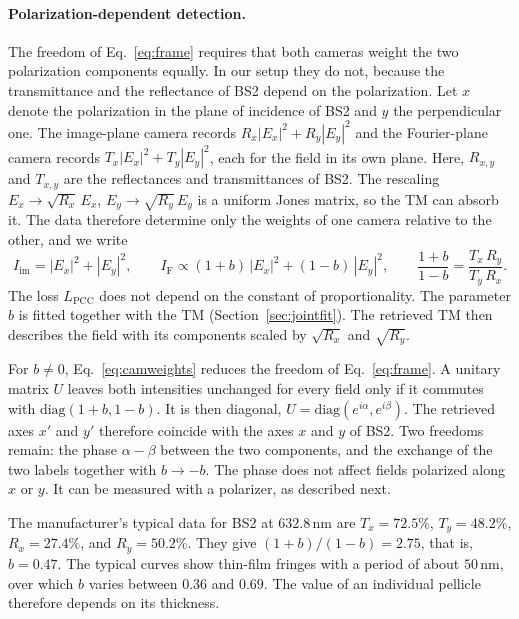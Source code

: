 \documentclass{article}
\begin{document}
\paragraph{Polarization-dependent detection.}
The freedom of Eq.~\eqref{eq:frame} requires that both cameras weight the two polarization components equally.
In our setup they do not, because the transmittance and the reflectance of BS2 depend on the polarization.
Let $x$ denote the polarization in the plane of incidence of BS2 and $y$ the perpendicular one.
The image-plane camera records $R_x|E_x|^2+R_y|E_y|^2$ and the Fourier-plane camera records $T_x|E_x|^2+T_y|E_y|^2$, each for the field in its own plane.
Here, $R_{x,y}$ and $T_{x,y}$ are the reflectances and transmittances of BS2.
The rescaling $E_x\to\sqrt{R_x}\,E_x$, $E_y\to\sqrt{R_y}\,E_y$ is a uniform Jones matrix, so the TM can absorb it.
The data therefore determine only the weights of one camera relative to the other, and we write
\begin{equation}
\label{eq:camweights}
I_{\mathrm{im}}=|E_x|^2+|E_y|^2,\qquad I_{\mathrm{F}}\propto(1+b)\,|E_x|^2+(1-b)\,|E_y|^2,\qquad \frac{1+b}{1-b}=\frac{T_x\,R_y}{T_y\,R_x}.
\end{equation}
The loss $L_{\mathrm{PCC}}$ does not depend on the constant of proportionality.
The parameter $b$ is fitted together with the TM (Section~\ref{sec:jointfit}).
The retrieved TM then describes the field with its components scaled by $\sqrt{R_x}$ and $\sqrt{R_y}$.

For $b\neq0$, Eq.~\eqref{eq:camweights} reduces the freedom of Eq.~\eqref{eq:frame}.
A unitary matrix $U$ leaves both intensities unchanged for every field only if it commutes with $\mathrm{diag}(1+b,1-b)$.
It is then diagonal, $U=\mathrm{diag}(e^{i\alpha},e^{i\beta})$.
The retrieved axes $x'$ and $y'$ therefore coincide with the axes $x$ and $y$ of BS2.
Two freedoms remain: the phase $\alpha-\beta$ between the two components, and the exchange of the two labels together with $b\to-b$.
The phase does not affect fields polarized along $x$ or $y$.
It can be measured with a polarizer, as described next.

The manufacturer's typical data for BS2 at $632.8$\,nm are $T_x=72.5\%$, $T_y=48.2\%$, $R_x=27.4\%$, and $R_y=50.2\%$.
They give $(1+b)/(1-b)=2.75$, that is, $b=0.47$.
The typical curves show thin-film fringes with a period of about $50$\,nm, over which $b$ varies between $0.36$ and $0.69$.
The value of an individual pellicle therefore depends on its thickness.
\end{document}

